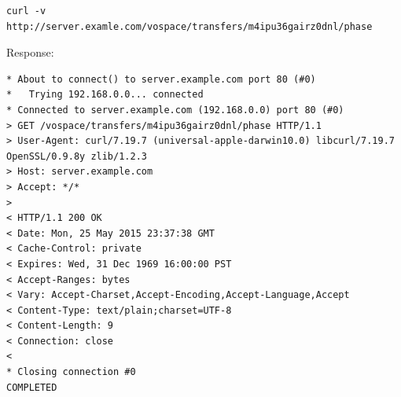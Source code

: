 \documentclass[11pt,a4paper]{ivoa}
\begin{document}
\begin{lstlisting}
curl -v http://server.examle.com/vospace/transfers/m4ipu36gairz0dnl/phase
\end{lstlisting}
Response:
\begin{lstlisting}
* About to connect() to server.example.com port 80 (#0)
*   Trying 192.168.0.0... connected
* Connected to server.example.com (192.168.0.0) port 80 (#0)
> GET /vospace/transfers/m4ipu36gairz0dnl/phase HTTP/1.1
> User-Agent: curl/7.19.7 (universal-apple-darwin10.0) libcurl/7.19.7 OpenSSL/0.9.8y zlib/1.2.3
> Host: server.example.com
> Accept: */*
>
< HTTP/1.1 200 OK
< Date: Mon, 25 May 2015 23:37:38 GMT
< Cache-Control: private
< Expires: Wed, 31 Dec 1969 16:00:00 PST
< Accept-Ranges: bytes
< Vary: Accept-Charset,Accept-Encoding,Accept-Language,Accept
< Content-Type: text/plain;charset=UTF-8
< Content-Length: 9
< Connection: close
<
* Closing connection #0
COMPLETED
\end{lstlisting}
\end{document}
